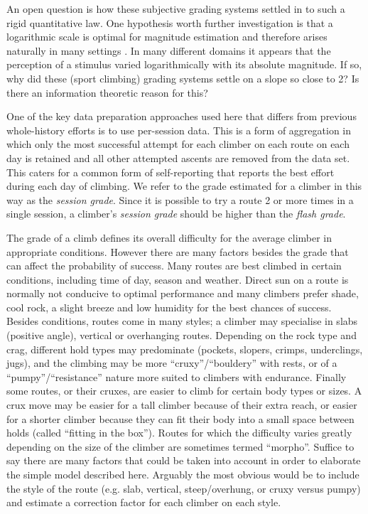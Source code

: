 \documentclass{article}
\begin{document}
An open question is how these subjective grading systems settled in to such a rigid quantitative law. One hypothesis worth further investigation is that a logarithmic scale is optimal for magnitude estimation and therefore arises naturally in many settings \cite{portugal2011weber}. In many different domains it appears that the perception of a stimulus varied logarithmically with its absolute magnitude. If so, why did these (sport climbing) grading systems settle on a slope so close to 2? Is there an information theoretic reason for this?

One of the key data preparation approaches used here that differs from previous whole-history efforts is to use per-session data. This is a form of aggregation in which only the most successful attempt for each climber on each route on each day is retained and all other attempted ascents are removed from the data set. This caters for a common form of self-reporting that reports the best effort during each day of climbing. We refer to the grade estimated for a climber in this way as the {\it session grade}. Since it is possible to try a route 2 or more times in a single session, a climber's {\it session grade} should be higher than the {\it flash grade}. 

The grade of a climb defines its overall difficulty for the average climber in appropriate conditions. However there are many factors besides the grade that can affect the probability of success. Many routes are best climbed in certain conditions, including time of day, season and weather. Direct sun on a route is normally not conducive to optimal performance and many climbers prefer shade, cool rock, a slight breeze and low humidity for the best chances of success. Besides conditions, routes come in many styles; a climber may specialise in slabs (positive angle), vertical or overhanging routes. Depending on the rock type and crag, different hold types may predominate (pockets, slopers, crimps, underclings, jugs), and the climbing may be more ``cruxy''/``bouldery'' with rests, or of a ``pumpy''/``resistance'' nature more suited to climbers with endurance. Finally some routes, or their cruxes, are easier to climb for certain body types or sizes. A crux move may be easier for a tall climber because of their extra reach, or easier for a shorter climber because they can fit their body into a small space between holds (called ``fitting in the box''). Routes for which the difficulty varies greatly depending on the size of the climber are sometimes termed ``morpho''. Suffice to say there are many factors that could be taken into account in order to elaborate the simple model described here. Arguably the most obvious would be to include the style of the route (e.g. slab, vertical, steep/overhung, or cruxy versus pumpy) and estimate a correction factor for each climber on each style. 
\end{document}
